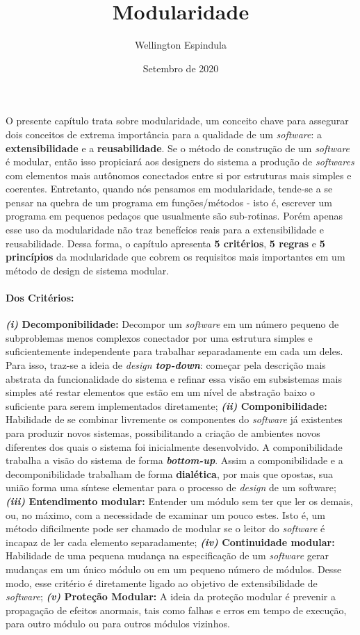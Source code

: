 \documentclass[12pt, a4paper]{article}
\title{Modularidade}
\author{Wellington Espindula}
\date{Setembro de 2020}
\begin{document}
    \maketitle
    O presente capítulo trata sobre modularidade, um conceito chave para assegurar dois conceitos de extrema importância para a qualidade de um \textit{software}: a \textbf{extensibilidade} e a \textbf{reusabilidade}.
    Se o método de construção de um \textit{software} é modular, então isso propiciará aos designers do sistema a produção de \textit{softwares} com elementos mais autônomos conectados entre si por estruturas mais simples e coerentes.
    Entretanto, quando nós pensamos em modularidade, tende-se a se pensar na quebra de um programa em funções/métodos - isto é, escrever um programa em pequenos pedaços que usualmente são sub-rotinas.
    Porém apenas esse uso da modularidade não traz benefícios reais para a extensibilidade e reusabilidade.
    Dessa forma, o capítulo apresenta \textbf{5 critérios}, \textbf{5 regras} e \textbf{5 princípios} da modularidade que cobrem os requisitos mais importantes em um método de design de sistema modular.
    
    
    \paragraph{Dos Critérios:} 
    \textbf{\textit{(i)} Decomponibilidade: }Decompor um \textit{software} em um número pequeno de subproblemas menos complexos conectador por uma estrutura simples e suficientemente independente para trabalhar separadamente em cada um deles. Para isso, traz-se a ideia de \textit{design \textbf{top-down}}: começar pela descrição mais abstrata da funcionalidade do sistema e refinar essa visão em subsistemas mais simples até restar elementos que estão em um nível de abstração baixo o suficiente para serem implementados diretamente;
    \textbf{\textit{(ii)} Componibilidade: }Habilidade de se combinar livremente os componentes do \textit{software} já existentes para produzir novos sistemas, possibilitando a criação de ambientes novos diferentes dos quais o sistema foi inicialmente desenvolvido. A componibilidade trabalha a visão do sistema de forma \textit{\textbf{bottom-up}}. Assim a componibilidade e a decomponibilidade trabalham de forma \textbf{dialética}, por mais que opostas, sua união forma uma síntese elementar para o processo de \textit{design} de um software;
    \textbf{\textit{(iii)} Entendimento modular: }Entender um módulo sem ter que ler os demais, ou, no máximo, com a necessidade de examinar um pouco estes. Isto é, um método dificilmente pode ser chamado de modular se o leitor do \textit{software} é incapaz de ler cada elemento separadamente;
    \textbf{\textit{(iv)} Continuidade modular: }Habilidade de uma pequena mudança na especificação de um \textit{software} gerar mudanças em um único módulo ou em um pequeno número de módulos. Desse modo, esse critério é diretamente ligado ao objetivo de extensibilidade de \textit{software};
    \textbf{\textit{(v)} Proteção Modular:} A ideia da proteção modular é prevenir a propagação de efeitos anormais, tais como falhas e erros em tempo de execução, para outro módulo ou para outros módulos vizinhos.
    
\end{document}
